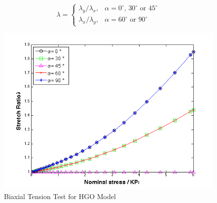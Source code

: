 \begin{equation}
\label{stretchratio}
\lambda = 
\begin{cases}
	\lambda_y/\lambda_x, & \text{$\alpha = 0^\circ$, $30^\circ$ or $45^\circ$} \\
	\lambda_x/\lambda_y, & \text{$\alpha = 60^\circ$ or $90^\circ$}
\end{cases}
\end{equation}
 
\begin{figure}[h!]
\centering
\includegraphics[width=.6\textwidth]{./figures/biaxial2.png}
\caption{Biaxial Tension Test for HGO Model}
\label{fig:biaxial2}
\end{figure}

